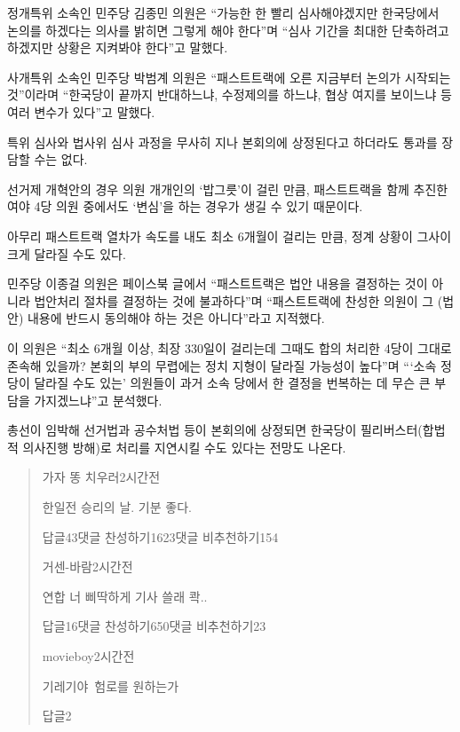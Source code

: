 \documentclass[final,doctor,korean]{konkukreport}
\begin{document}
정개특위 소속인 민주당 김종민 의원은 ``가능한 한 빨리 심사해야겠지만 한국당에서 논의를 하겠다는 의사를 밝히면 그렇게 해야 한다''며 ``심사 기간을 최대한 단축하려고 하겠지만 상황은 지켜봐야 한다''고 말했다.

사개특위 소속인 민주당 박범계 의원은 ``패스트트랙에 오른 지금부터 논의가 시작되는 것''이라며 ``한국당이 끝까지 반대하느냐, 수정제의를 하느냐, 협상 여지를 보이느냐 등 여러 변수가 있다''고 말했다.

특위 심사와 법사위 심사 과정을 무사히 지나 본회의에 상정된다고 하더라도 통과를 장담할 수는 없다.

선거제 개혁안의 경우 의원 개개인의 `밥그릇'이 걸린 만큼, 패스트트랙을 함께 추진한 여야 4당 의원 중에서도 `변심'을 하는 경우가 생길 수 있기 때문이다.

아무리 패스트트랙 열차가 속도를 내도 최소 6개월이 걸리는 만큼, 정계 상황이 그사이 크게 달라질 수도 있다.

민주당 이종걸 의원은 페이스북 글에서 ``패스트트랙은 법안 내용을 결정하는 것이 아니라 법안처리 절차를 결정하는 것에 불과하다''며 ``패스트트랙에 찬성한 의원이 그 (법안) 내용에 반드시 동의해야 하는 것은 아니다''라고 지적했다.

이 의원은 ``최소 6개월 이상, 최장 330일이 걸리는데 그때도 합의 처리한 4당이 그대로 존속해 있을까? 본회의 부의 무렵에는 정치 지형이 달라질 가능성이 높다''며 ```소속 정당이 달라질 수도 있는' 의원들이 과거 소속 당에서 한 결정을 번복하는 데 무슨 큰 부담을 가지겠느냐''고 분석했다.

총선이 임박해 선거법과 공수처법 등이 본회의에 상정되면 한국당이 필리버스터(합법적 의사진행 방해)로 처리를 지연시킬 수도 있다는 전망도 나온다.
\clearpage
\begin{abstract}

가자 똥 치우러2시간전 \par
한일전 승리의 날. 기분 좋다. \par
답글43댓글 찬성하기1623댓글 비추천하기154 

거센-바람2시간전 \par
연합 너 삐딱하게 기사 쓸래 콱.. \par
답글16댓글 찬성하기650댓글 비추천하기23 

movieboy2시간전 \par 
기레기야\, 험로를 원하는가 \par 
답글2
\end{abstract}
%
\end{document}
